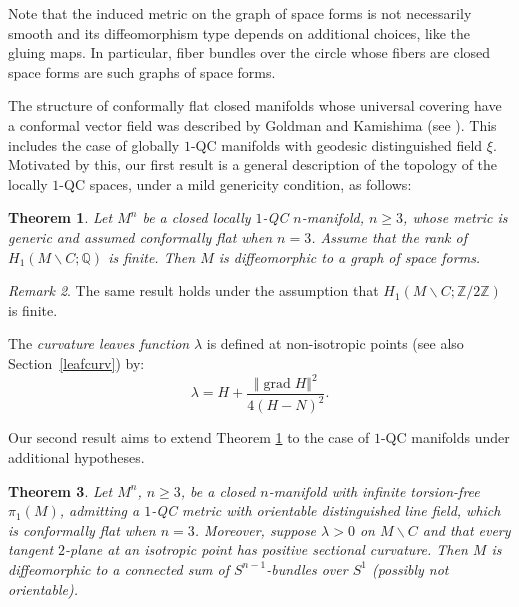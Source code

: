 \documentclass[10pt]{amsart}
\let\moins\smallsetminus
\DeclareMathOperator{\grad}{grad}
\let\parallel\Vert
\newtheorem{theorem}{Theorem}[section]
\theoremstyle{definition}
\theoremstyle{remark}
\newtheorem{remark}[theorem]{Remark}
\numberwithin{equation}{section}
\newcommand{\ZZ}{\mathbb Z}
\begin{document}
Note that the induced metric on the graph of space forms is not necessarily smooth and its
diffeomorphism type depends on additional choices, like the gluing maps.
In particular, fiber bundles over the circle whose fibers are closed space forms
are such graphs of space forms.

The structure of conformally flat closed manifolds whose universal covering
have a conformal vector field was described by Goldman and Kamishima (see \cite{Go-Kam}).
This includes the case of globally $1$-QC manifolds with geodesic distinguished field $\xi$.
Moti\-vated by this, our first result is a general description of the
topology of the locally $1$-QC spaces, under a mild genericity condition, as follows:


\begin{theorem}\label{arbitrary}
Let $M^n$ be a closed locally $1$-QC $n$-manifold, $n\geq3$, whose metric is generic and
assumed conformally flat when $n=3$. Assume that the rank of \hbox{$H_1(M\moins C;\mathbb Q)$} is finite.
Then $M$ is diffeomorphic to a graph of space forms.
\end{theorem}


\begin{remark}
The same result holds under the assumption that $H_1(M\moins C;\ZZ/2\ZZ)$ is finite.
\end{remark}

The \emph{curvature leaves function} $\lambda$ is defined at non-isotropic points
(see also Section~\ref{leafcurv}) by:
\[
\lambda=H + \frac{\parallel \grad H\parallel^2}{4(H-N)^2}.
\]

Our second result aims to extend Theorem \ref{arbitrary} to the case of $1$-QC manifolds under additional hypotheses.

\begin{theorem}\label{lambdapositive}
Let $M^n$, $n\geq3$, be a closed $n$-manifold with infinite torsion-free
$\pi_1(M)$, admitting a $1$-QC metric with orientable distinguished line field, which is conformally flat when $n=3$.
Moreover, suppose $\lambda >0$ on $M\moins C$ and that every tangent $2$-plane at an isotropic point has
positive sectional curvature.
Then $M$ is diffeomorphic to a connected sum of $S^{n-1}$-bundles over $S^1$ (possibly not orientable).
\end{theorem}
\end{document}
